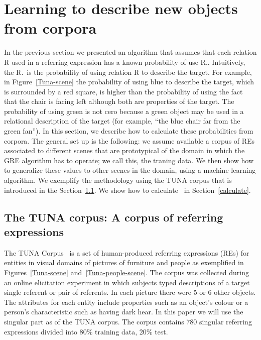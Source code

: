 \section{Learning to describe new objects from corpora}
\label{sec:learning}

In the previous section we presented an algorithm that assumes that each relation R 
used in a referring expression has a known probability of use R.\puse. 
Intuitively, the R.\puse~is the probability of using relation R to describe the target. For example, in Figure~\ref{Tuna-scene} the probability of using blue to describe the target, which is surrounded by a red square, is higher than the probability of using the fact that the chair is facing left although both are properties of the target. The probability of using green is not cero because a green object may be used in a relational description of the target (for example, ``the blue chair far from the green fan''). In this section, 
we describe how to calculate these probabilities from corpora.  
The general set up is the following: we assume available a corpus of REs associated 
to different scenes that are prototypical of the domain in which the GRE algorithm has to operate; we call this, the traning data.   
We then show how to generalize these values to other scenes in the domain, using a machine learning algorithm. We exemplify the methodology using the TUNA corpus that is introduced in the Section~\ref{sec:tuna}. We show how to calculate \puse~in Section~\ref{calculate}. 

\subsection{The TUNA corpus: A corpus of referring expressions}
\label{sec:tuna}
The TUNA Corpus~\cite{Gatt:2008:TCO:1708322.1708365} is a set of human-produced referring expressions (REs) for entities in visual domains of pictures of furniture and people as exemplified in Figures~\ref{Tuna-scene} and~\ref{Tuna-people-scene}. The corpus was
collected during an online elicitation experiment in which subjects typed descriptions of a target single referent or pair of referents. 
In each picture there were 5 or 6 other objects. 
The attributes for each entity include properties such as an object's colour or a person's characteristic such as having dark hear.
In this paper we will use the singular part as of the TUNA corpus. The corpus contains 780 singular referring expressions divided
into 80\% training data, 20\% test. 

